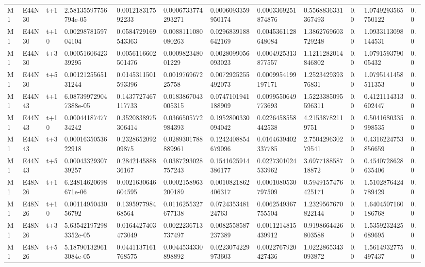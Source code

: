 \begin{landscape}
\begin{longtable}{llllllllllll}
M1 & E44N30 & t+1 & 2.58135597756794e-05 & 0.001218317592233 & 0.0006733774293271 & 0.0006093359950174 & 0.0003369251874876 & 0.5568836331367493 & 0.0 & 1.0749293565750122 & 0.0 \\
M1 & E44N30 & t+10 & 0.0029878159704104 & 0.0584729169543363 & 0.0088111080080263 & 0.0296839188642169 & 0.0045361128648084 & 1.3862769603729248 & 0.0 & 1.0933113098144531 & 0.0 \\
M1 & E44N30 & t+3 & 0.0005160642339295 & 0.0056116602501476 & 0.000982348001229 & 0.0028099056093023 & 0.0004925313877557 & 1.1211282014846802 & 0.0 & 1.079159379005432 & 0.0 \\
M1 & E44N30 & t+5 & 0.0012125565131244 & 0.0145311501593396 & 0.001976967225758 & 0.0072925255492073 & 0.0009954199197171 & 1.252342939376831 & 0.0 & 1.0795141458511353 & 0.0 \\
M1 & E44N43 & t+1 & 6.087399729047388e-05 & 0.1437727467117733 & 0.0183867043005315 & 0.0747101941188909 & 0.0099550649773693 & 1.5223385095596311 & 0.0 & 0.4121114313602447 & 0.0 \\
M1 & E44N43 & t+10 & 0.0004418747734242 & 0.3520838975306414 & 0.0366505772984393 & 0.1952800330094042 & 0.0226458558442538 & 4.21538782119751 & 0.0 & 0.5041680335998535 & 0.0 \\
M1 & E44N43 & t+3 & 0.0001635053622918 & 0.232865209209875 & 0.0289301788889961 & 0.1242408854679096 & 0.0164639402337785 & 2.750429630279541 & 0.0 & 0.4316224753856659 & 0.0 \\
M1 & E44N43 & t+5 & 0.0004332930739257 & 0.284214588836167 & 0.0387293028757243 & 0.1541625914386177 & 0.0227301024533962 & 3.697718858718872 & 0.0 & 0.4540728628635406 & 0.0 \\
M1 & E48N26 & t+1 & 6.24814620698671e-06 & 0.0021630646604595 & 0.0002158963200189 & 0.0010821862406317 & 0.0001080530797509 & 0.5949157476425171 & 0.0 & 1.5102876424789429 & 0.0 \\
M1 & E48N26 & t+10 & 0.0011495043056792 & 0.139597798468564 & 0.0116255327677138 & 0.072435348124763 & 0.0062549367755504 & 1.2329567670822144 & 0.0 & 1.6404507160186768 & 0.0 \\
M1 & E48N26 & t+3 & 5.635421972983352e-05 & 0.0164427403473049 & 0.0022236713737497 & 0.0082558587237389 & 0.0011214815439912 & 0.9198664426803588 & 0.0 & 1.5359232425689695 & 0.0 \\
M1 & E48N26 & t+5 & 5.187901329613084e-05 & 0.0441137161768575 & 0.0044534330898892 & 0.0223074229973603 & 0.0022767920427436 & 1.0222865343093872 & 0.0 & 1.5614932775497437 & 0.0 \\

\end{longtable}
\end{landscape}
